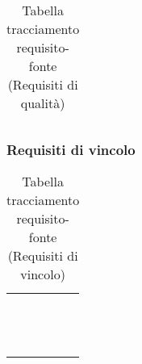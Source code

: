 {{{{{{{\begin{center}
\begin{longtable}{|p{7.5cm}|p{7.5cm}|}
\caption[Tabella tracciamento requisito-fonte]{Tabella tracciamento requisito-fonte (Requisiti di qualità)}\label{4.7}\\
\end{longtable}
\end{center}

\clearpage
\subsubsection{Requisiti di vincolo}\label{RequisitiTracciamentoDeiRequisitiFonteRequisitiDiVincolo}
		
\def\tabularxcolumn#1{m{#1}}
{
	\begin{center}
		\renewcommand{\arraystretch}{1.4}
		\begin{longtable}{|p{7.5cm}|p{7.5cm}|}	
		\hline
		\rowcolor{airforceblue}
		\makecell[tc]{\textbf{Codice RS}} & \makecell[c]{\textbf{Fonte}}  \\
		\makecell[tc]{RSVO1} & \makecell[tc]{Capitolato$_{\scaleto{G}{3pt}}$}\\
		\hline	
		\makecell[tc]{RSVO1.1} & \makecell[tc]{Capitolato$_{\scaleto{G}{3pt}}$}\\
		\hline
		\makecell[tc]{RSVO1.2} & \makecell[tc]{V. esterno 02-02-2021}\\
		\hline
		\makecell[tc]{RSVF2} & \makecell[tc]{V. esterno 02-02-2021}\\
		\hline
		\makecell[tc]{RSVO3} & \makecell[tc]{Capitolato$_{\scaleto{G}{3pt}}$}\\
		\hline
		\makecell[tc]{RSVO4} & \makecell[tc]{Capitolato$_{\scaleto{G}{3pt}}$}\\
		\hline
		\makecell[tc]{RSVO5} & \makecell[tc]{Interno}\\
		\hline
		\makecell[tc]{RSVF6} & \makecell[tc]{Interno}\\
		\hline
		\makecell[tc]{RSVO7} & \makecell[tc]{Capitolato$_{\scaleto{G}{3pt}}$}\\
		\hline
		\makecell[tc]{RSVF8} & \makecell[tc]{V. esterno 02-02-2021}\\
		\hline
		\makecell[tc]{RSVO9} & \makecell[tc]{Interno}\\
		\hline
		\rowcolor{white}

		\caption[Tabella tracciamento requisito-fonte]{Tabella tracciamento requisito-fonte (Requisiti di vincolo)}\label{4.8}\\
	\end{longtable}
\end{center}
\clearpage

}}}}}}}}
